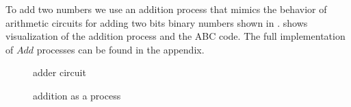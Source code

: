 To add two numbers we use an addition process that mimics the behavior of arithmetic circuits for adding two bits binary numbers shown in 
.
 shows visualization of the addition process and the ABC code.
The full implementation of $Add$ processes can be found in the appendix.
\begin{figure}[H]%
\centering
{}
\caption{adder circuit}
\label{tra_adder_circuit}%
\end{figure}


\begin{figure}[H]%
\centering
{}%
\hspace{\fill}
%
\hspace{1em}%
%
\caption{addition as a process}
\label{tra_addition}%
\end{figure}
